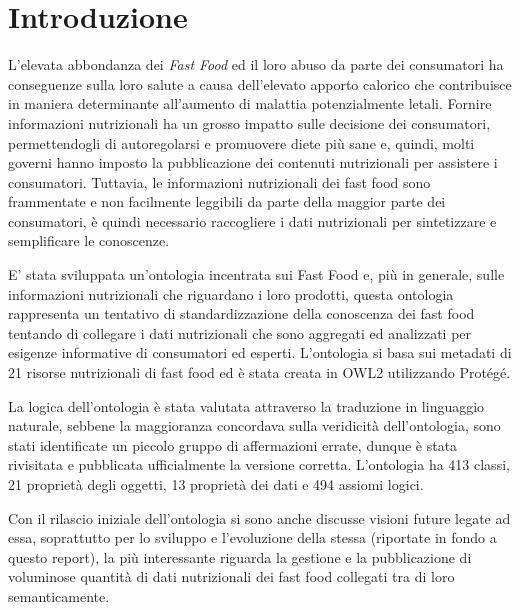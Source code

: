 \section{Introduzione}
L'elevata abbondanza dei \emph{Fast Food} ed il loro abuso da parte dei consumatori ha conseguenze sulla loro salute a causa dell'elevato apporto calorico che contribuisce in maniera determinante all'aumento di malattia potenzialmente letali. Fornire informazioni nutrizionali ha un grosso impatto sulle decisione dei consumatori, permettendogli di autoregolarsi e promuovere diete più sane e, quindi, molti governi hanno imposto la pubblicazione dei contenuti nutrizionali per assistere i consumatori. Tuttavia, le informazioni nutrizionali dei fast food sono frammentate e non facilmente leggibili da parte della maggior parte dei consumatori, è quindi necessario raccogliere i dati nutrizionali per sintetizzare e semplificare le conoscenze.

E' stata sviluppata un'ontologia incentrata sui Fast Food e, più in generale, sulle informazioni nutrizionali che riguardano i loro prodotti, questa ontologia rappresenta un tentativo di standardizzazione della conoscenza dei fast food tentando di collegare i dati nutrizionali che sono aggregati ed analizzati per esigenze informative di consumatori ed esperti. L'ontologia si basa sui metadati di 21 risorse nutrizionali di fast food ed è stata creata in OWL2 utilizzando Protégé.

La logica dell'ontologia è stata valutata attraverso la traduzione in linguaggio naturale, sebbene la maggioranza concordava sulla veridicità dell'ontologia, sono stati identificate un piccolo gruppo di affermazioni errate, dunque è stata rivisitata e pubblicata ufficialmente la versione corretta. L'ontologia ha 413 classi, 21 proprietà degli oggetti, 13 proprietà dei dati e 494 assiomi logici.

Con il rilascio iniziale dell'ontologia si sono anche discusse visioni future legate ad essa, soprattutto per lo sviluppo e l'evoluzione della stessa (riportate in fondo a questo report), la più interessante riguarda la gestione e la pubblicazione di voluminose quantità di dati nutrizionali dei fast food collegati tra di loro semanticamente.
